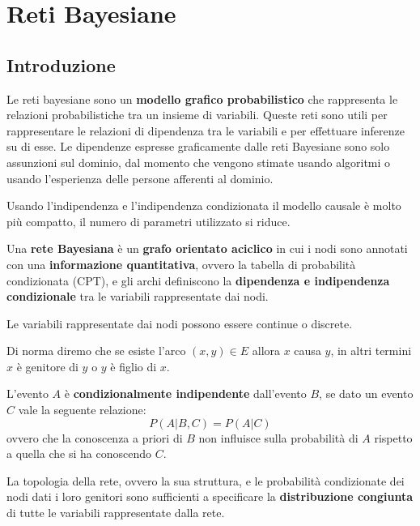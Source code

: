 \chapter{Reti Bayesiane} \label{cap:RetiBayesiane}
\section{Introduzione}
Le reti bayesiane sono un \textbf{modello grafico probabilistico} che rappresenta
le relazioni probabilistiche tra un insieme di variabili. Queste reti sono utili
per rappresentare le relazioni di dipendenza tra le variabili e per effettuare
inferenze su di esse. Le dipendenze espresse graficamente dalle reti Bayesiane
sono solo assunzioni sul dominio, dal momento che vengono stimate usando algoritmi
o usando l'esperienza delle persone afferenti al dominio.

Usando l'indipendenza e l'indipendenza condizionata il modello causale è molto
più compatto, il numero di parametri utilizzato si riduce.
\begin{definizione}
    Una \textbf{rete Bayesiana} è un \textbf{grafo orientato aciclico} in cui i
    nodi sono annotati con una \textbf{informazione quantitativa}, ovvero la
    tabella di probabilità condizionata (CPT), e gli archi definiscono la
    \textbf{dipendenza e indipendenza condizionale} tra le variabili rappresentate
    dai nodi.
\end{definizione}
\begin{nota}
    Le variabili rappresentate dai nodi possono essere continue o discrete.
\end{nota}
Di norma diremo che se esiste l'arco $(x,y)\in E$ allora $x$ causa $y$, in altri
termini $x$ è genitore di $y$ o $y$ è figlio di $x$.
\begin{center}
\end{center}
\begin{definizione}
    L'evento $A$ è \textbf{condizionalmente indipendente} dall'evento $B$, se dato
    un evento $C$ vale la seguente relazione:
    \begin{equation}
        P(A|B,C) = P(A|C)
    \end{equation}
    ovvero che la conoscenza a priori di $B$ non influisce sulla probabilità di
    $A$ rispetto a quella che si ha conoscendo $C$.
\end{definizione}
La topologia della rete, ovvero la sua struttura, e le probabilità condizionate
dei nodi dati i loro genitori sono sufficienti a specificare la \textbf{distribuzione
    congiunta} di tutte le variabili rappresentate dalla rete.

